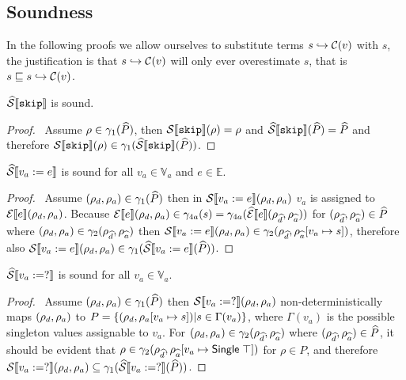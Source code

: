 \subsection{Soundness}\label{subsec:soundness}

In the following proofs we allow ourselves to substitute terms $s \hookrightarrow \mathcal{C}(v)$ with $s$, the justification is that $s \hookrightarrow \mathcal{C}(v)$ will only ever overestimate $s$, that is $s \sqsubseteq s \hookrightarrow \mathcal{C}(v)$.

\begin{lemma}\label{thm:sound-skip}
    $\widehat{\mathcal{S}} \llbracket \texttt{skip} \rrbracket$ is sound.
\end{lemma}

\begin{proof}
    \pf\ Assume $\rho \in \gamma_1(\widehat{P})$, then $\mathcal{S} \llbracket \texttt{skip} \rrbracket(\rho) = \rho$ and $\widehat{\mathcal{S}} \llbracket \texttt{skip} \rrbracket(\widehat{P}) = \widehat{P}$ and therefore $\mathcal{S} \llbracket \texttt{skip} \rrbracket(\rho) \in \gamma_1(\widehat{\mathcal{S}} \llbracket \texttt{skip} \rrbracket(\widehat{P}))$.
\end{proof}

\begin{lemma}\label{thm:sound-assign}
    $\widehat{\mathcal{S}} \llbracket v_a := e \rrbracket$ is sound for all $v_a \in \mathbb{V}_a$ and $e \in \mathbb{E}$.
\end{lemma}

\begin{proof}
    \pf\
    Assume $(\rho_{d}, \rho_{a}) \in \gamma_1(\widehat{P})$ then in $\mathcal{S} \llbracket v_a := e \rrbracket(\rho_{d}, \rho_{a})$ $v_a$ is assigned to $\mathcal{E}\llbracket e \rrbracket(\rho_{d}, \rho_{a})$. Because $\mathcal{E}\llbracket e \rrbracket(\rho_{d}, \rho_{a}) \in \gamma_{4a}(s) = \gamma_{4a}(\widehat{\mathcal{E}}\llbracket e \rrbracket(\rho_{\widehat{d}}, \rho_{\widehat{a}}))$ for $(\rho_{\widehat{d}}, \rho_{\widehat{a}}) \in \widehat{P}$ where $(\rho_{d}, \rho_{a}) \in \gamma_2(\rho_{\widehat{d}}, \rho_{\widehat{a}})$ then $\mathcal{S} \llbracket v_a := e \rrbracket(\rho_{d}, \rho_{a}) \in \gamma_2(\rho_{\widehat{d}}, \rho_{\widehat{a}}[v_a \mapsto s])$, therefore also $\mathcal{S} \llbracket v_a := e \rrbracket(\rho_{d}, \rho_{a})\in \gamma_1(\widehat{\mathcal{S}} \llbracket v_a := e \rrbracket(\widehat{P}))$.
\end{proof}

\begin{lemma}\label{thm:sound-random}
    $\widehat{\mathcal{S}} \llbracket v_a := ? \rrbracket$ is sound for all $v_a \in \mathbb{V}_a$.
\end{lemma}

\begin{proof}
    \pf\
    Assume $(\rho_{d}, \rho_{a}) \in \gamma_1(\widehat{P})$ then $\mathcal{S} \llbracket v_a := ? \rrbracket(\rho_{d}, \rho_{a})$ non-deterministically maps $(\rho_{d}, \rho_{a})$ to $P = \{ (\rho_{d}, \rho_{a}[v_a \mapsto s]) | s \in \Gamma(v_a) \}$, where $\Gamma(v_a)$ is the possible singleton values assignable to $v_a$.
    For $(\rho_{d}, \rho_{a}) \in \gamma_2(\rho_{\widehat{d}}, \rho_{\widehat{a}})$ where $(\rho_{\widehat{d}}, \rho_{\widehat{a}}) \in \widehat{P}$, it should be evident that $\rho \in \gamma_2(\rho_{\widehat{d}}, \rho_{\widehat{a}}[v_a \mapsto \mathsf{Single}\;\top])$ for $\rho \in P$, and therefore $\mathcal{S} \llbracket v_a := ? \rrbracket(\rho_{d}, \rho_{a}) \subseteq \gamma_1(\widehat{\mathcal{S}} \llbracket v_a := ? \rrbracket(\widehat{P}))$.
\end{proof}

